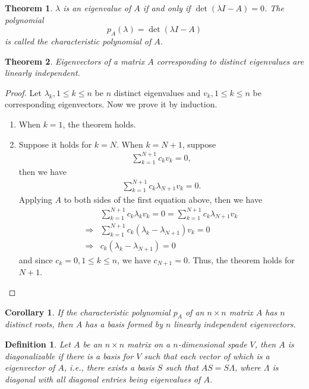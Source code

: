 \documentclass[11pt]{book}
\newtheorem{definition}{Definition}[section]
\newtheorem{theorem}{Theorem}[section]
\newtheorem{corollary}{Corollary}[theorem]
\theoremstyle{definition}
\numberwithin{equation}{chapter}
\begin{document}
\medskip

\begin{theorem}
$\lambda$ is an eigenvalue of $A$ if and only if $\det (\lambda I-A) = 0$. The polynomial
$$p_A(\lambda) = \det (\lambda I-A)$$
is called the characteristic polynomial of $A$.
\end{theorem}

\medskip

\begin{theorem}
Eigenvectors of a matrix $A$ corresponding to distinct eigenvalues
are linearly independent.
\end{theorem}
\begin{proof}
Let $\lambda_k, 1\leq k \leq n$ be $n$ distinct eigenvalues and $v_k, 1\leq k \leq n$ be corresponding eigenvectors. Now we prove it by induction.
\begin{enumerate}[label=(\alph*)]
    \item When $k = 1$, the theorem holds.
    \item Suppose it holds for $k = N$. When $k = N+1$, suppose 
    \begin{align*}
        \sum^{N+1}_{k=1}c_k v_k = 0,
    \end{align*}
    then we have
    \begin{align*}
        \sum^{N+1}_{k=1}c_k \lambda_{N+1} v_k = 0.
    \end{align*}
    Applying $A$ to both sides of the first equation above, then we have
    \begin{align*}
        & \sum^{N+1}_{k=1}c_k \lambda_k v_k = 0 = \sum^{N+1}_{k=1}c_k \lambda_{N+1} v_k \\
        \Rightarrow & \sum^{N+1}_{k=1}c_k (\lambda_k  - \lambda_{N+1}) v_k = 0 \\
        \Rightarrow & c_k (\lambda_k  - \lambda_{N+1}) = 0
    \end{align*}
    and since $c_k = 0, 1\leq k\leq n$, we have $c_{N+1} = 0$. Thus, the theorem holds for $N+1$. 
\end{enumerate}
\end{proof}

\medskip

\begin{corollary}
If the characteristic polynomial $p_A$ of an $n\times n$ matrix $A$ has $n$ distinct roots, then $A$ has a basis formed by $n$ linearly independent eigenvectors.
\end{corollary}

\medskip

\begin{definition}{\rm \cite{27}}
Let $A$ be an $n \times n$ matrix on a $n$-dimensional spade $V$, then $A$ is diagonalizable if there is a basis for $V$ such that each vector of which is a eigenvector of $A$, i.e., there exists a basis $S$ such that $AS = S\Lambda$, where $\Lambda$ is diagonal with all diagonal entries being eigenvalues of $A$.
\end{definition}
\end{document}
